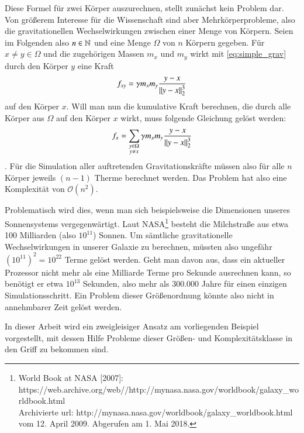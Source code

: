     Diese Formel für zwei Körper auszurechnen, stellt zunächst kein Problem dar. Von größerem Interesse für die Wissenschaft sind aber Mehrkörperprobleme, also die gravitationellen 
    Wechselwirkungen zwischen einer Menge von Körpern. Seien im Folgenden also $n \in \mathbb{N}$ und eine Menge $\Omega$ von $n$ Körpern gegeben.
    Für $x \neq y \in \Omega$ und die zugehörigen Massen $m_x$ und $m_y$ wirkt mit \autoref{eq:simple_grav} durch den Körper $y$ eine Kraft 
    \begin{equation}
      f_{xy} = \gamma m_x m_y \frac{y - x}{\left\lVert y - x\right\rVert^3_2}
      \label{eq:multi_grav}
    \end{equation}
    auf den Körper $x$. Will man nun die kumulative Kraft berechnen, die durch alle Körper aus $\Omega$ auf den Körper $x$ wirkt, muss folgende Gleichung gelöst werden:
    \begin{equation}
      f_x = \sum_{\substack{y \in \Omega \\ y \neq x}} \gamma m_x m_y \frac{y - x}{\left\lVert y - x\right\rVert^3_2}
      \label{eq:sum_grav}
    \end{equation}
    \citep{wissrech}.
    Für die Simulation aller auftretenden Gravitationskräfte müssen also für alle $n$ Körper jeweils $(n-1)$ Therme berechnet werden. Das Problem hat also eine Komplexität von
    $\mathcal{O}(n^2)$.
    
    Problematisch wird dies, wenn man sich beispielsweise die Dimensionen unseres Sonnensystems vergegenwärtigt. Laut NASA\footnote{
    World Book at NASA [2007]: 
    https://web.archive.org/\-web//\-http://mynasa.nasa.gov/\-worldbook/\-galaxy\_worldbook.html\\
    Archivierte url: http://mynasa.nasa.gov/worldbook/galaxy\_worldbook.html vom 12. April 2009. Abgerufen am 1. Mai 2018.} besteht die Milchstraße aus etwa 100 Milliarden
    (also $10^{11}$) Sonnen. Um sämtliche gravitationelle Wechselwirkungen in unserer Galaxie zu berechnen, müssten also ungefähr $(10^{11})^2 = 10^{22}$ Terme gelöst werden. Geht man 
    davon aus, dass ein aktueller Prozessor nicht mehr als eine Milliarde Terme pro Sekunde ausrechnen kann, so benötigt er etwa $10^{13}$ Sekunden, also mehr als 300.000 Jahre für 
    einen einzigen Simulationsschritt. Ein Problem dieser Größenordnung könnte also nicht in annehmbarer Zeit gelöst werden. \citep{wissrech} 
    
    In dieser Arbeit wird ein zweigleisiger Ansatz am vorliegenden Beispiel vorgestellt, mit dessen Hilfe Probleme dieser Größen- und Komplexitätsklasse in den Griff zu bekommen sind.
    
